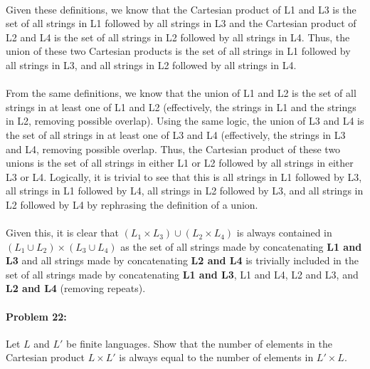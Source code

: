 \documentclass[10pt]{article}
\begin{document}
\paragraph{} Given these definitions, we know that the Cartesian product of L1 and L3 is the set of all strings in L1 followed by all strings in L3 and the Cartesian product of L2 and L4 is the set of all strings in L2 followed by all strings in L4. Thus, the union of these two Cartesian products is the set of all strings in L1 followed by all strings in L3, and all strings in L2 followed by all strings in L4.
\paragraph{} From the same definitions, we know that the union of L1 and L2 is the set of all strings in at least one of L1 and L2 (effectively, the strings in L1 and the strings in L2, removing possible overlap). Using the same logic, the union of L3 and L4 is the set of all strings in at least one of L3 and L4 (effectively, the strings in L3 and L4, removing possible overlap. Thus, the Cartesian product of these two unions is the set of all strings in either L1 or L2 followed by all strings in either L3 or L4. Logically, it is trivial to see that this is all strings in L1 followed by L3, all strings in L1 followed by L4, all strings in L2 followed by L3, and all strings in L2 followed by L4 by rephrasing the definition of a union. 
\paragraph{} Given this, it is clear that $(L_1 \times L_3) \cup (L_2 \times L_4)$ is always contained in $(L_1 \cup L_2) \times (L_3 \cup L_4)$ as the set of all strings made by concatenating \textbf{L1 and L3} and all strings made by concatenating \textbf{L2 and L4} is trivially included in the set of all strings made by concatenating \textbf{L1 and L3}, L1 and L4, L2 and L3, and \textbf{L2 and L4} (removing repeats).

\hrulefill
\paragraph{Problem 22:}
Let $L$ and $L'$ be finite languages. Show that the number of elements
in the Cartesian product $L \times L'$ is always equal to the number
of elements in $L' \times L$.
\end{document}
